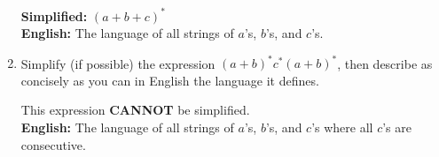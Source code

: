 \documentclass[12pt]{article}
\begin{document}
\begin{enumerate}
\textbf{Simplified:} $(a + b + c)^*$\\
\textbf{English:} The language of all strings of $a$'s, $b$'s, and $c$'s.



\item Simplify (if possible) the expression $(a + b)^*c^*(a + b)^*$, then describe as concisely as you can in English the language it defines.

This expression \textbf{CANNOT} be simplified.\\
\textbf{English:} The language of all strings of $a$'s, $b$'s, and $c$'s where all $c$'s are consecutive.


\end{enumerate}
\end{document}
